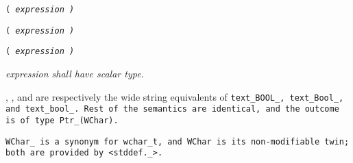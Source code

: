 
 \tt{(} \it{expression} \tt{)}

 \tt{(} \it{expression} \tt{)}

 \tt{(} \it{expression} \tt{)}


\it{expression} shall have scalar type.


, , and  are respectively the
wide string equivalents of \tt{text_BOOL_}, \tt{text_Bool_}, and \tt{text_bool_}.
Rest of the semantics are identical, and the outcome is of type \tt{Ptr_(WChar)}.

\note \tt{WChar_} is a synonym for \tt{wchar_t}, and \tt{WChar}
is its non-modifiable twin; both are provided by \tt{<stddef._>}.
